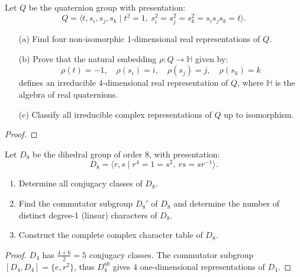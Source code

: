 \begin{prob}[S2012-Q4]
    Let \( Q \) be the quaternion group with presentation:
\[
Q = \langle t, s_i, s_j, s_k \mid t^2 = 1,\ s_i^2 = s_j^2 = s_k^2 = s_i s_j s_k = t \rangle.
\]

\begin{enumerate}
    \item[(a)] Find four non-isomorphic 1-dimensional real representations of \( Q \).
    
    \item[(b)] Prove that the natural embedding \( \rho \colon Q \to \mathbb{H} \) given by:
    \[
    \rho(t) = -1, \quad \rho(s_i) = i, \quad \rho(s_j) = j, \quad \rho(s_k) = k
    \]
    defines an irreducible 4-dimensional real representation of \( Q \), where \( \mathbb{H} \) is the algebra of real quaternions.
    
    \item[(c)] Classify all irreducible complex representations of \( Q \) up to isomorphism.
\end{enumerate}
\end{prob}
\begin{proof}
\end{proof}


\begin{prob}[F2004-Q6]
    Let \( D_8 \) be the dihedral group of order 8, with presentation:
    \[
    D_8 = \langle r, s \mid r^4 = 1 = s^2,\ rs = sr^{-1} \rangle.
    \]
    
    \begin{enumerate}
        \item Determine all conjugacy classes of \( D_8 \).
        
        \item Find the commutator subgroup \( D_8' \) of \( D_8 \) and determine the number of distinct degree-1 (linear) characters of \( D_8 \).
        
        \item Construct the complete complex character table of \( D_8 \).
    \end{enumerate}
\end{prob}
\begin{proof}
    $D_{4}$ has $\frac{4+6}{2}=5$ conjugacy classes. The commutator subgroup $[D_4,D_4]=\{e,r^2\}$, thus $D_4^{ab}$ gives $4$ one-dimensional representations of $D_4$.
\end{proof}

